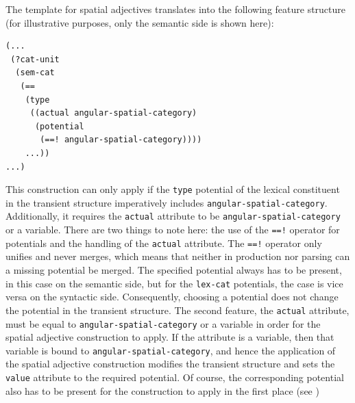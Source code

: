 The template for spatial adjectives translates into the following 
feature structure (for illustrative purposes, only the semantic 
side is shown here):
\ea
\label{e:def-fun-spatial-adjective-potentials}
\begin{lstlisting}
(...
 (?cat-unit
  (sem-cat 
   (== 
    (type
     ((actual angular-spatial-category)
      (potential 
       (==! angular-spatial-category))))
    ...))
...)
\end{lstlisting}
\z
This construction can only apply if the {\footnotesize\tt type} potential 
of the lexical constituent in the transient structure imperatively includes 
{\footnotesize\tt angular-spatial-category}. Additionally,
it requires the {\footnotesize\tt actual} attribute
to be {\footnotesize\tt angular-spatial-category} or a variable. There are two
things to note here: the use of the {\footnotesize\tt ==!} operator for 
potentials and the handling of the {\footnotesize\tt actual} attribute. 
The {\footnotesize\tt ==!} operator only unifies and never merges, 
which means that neither in production nor parsing can a missing 
potential be merged. The specified potential always has to be present, 
in this case on the semantic side, but for the {\footnotesize\tt lex-cat} 
potentials, the case is vice versa on the 
syntactic side. Consequently, choosing a potential does not 
change the potential in the transient structure. 
The second feature, the {\footnotesize\tt actual} attribute, must be equal 
to {\footnotesize\tt angular-spatial-category} or a variable in order for the spatial 
adjective construction to apply. If the attribute
is a variable, then that variable is bound to {\footnotesize\tt angular-spatial-category}, 
and hence the application of the spatial adjective construction 
modifies the transient structure and sets the {\footnotesize\tt value} attribute 
to the required potential. Of course, the corresponding potential also 
has to be present for the construction to
apply in the first place (see )

